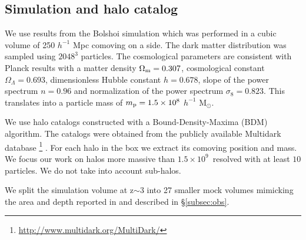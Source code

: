 \documentclass{emulateapj}
\newcommand{\hMsun}{{\ifmmode{h^{-1}{\rm {M_{\odot}}}}\else{$h^{-1}{\rm{M_{\odot}}}$}\fi}}
\begin{document}
\subsection{Simulation and halo catalog}
\label{subsec:sim}

We use results from the Bolshoi simulation \citep{Bolshoi,BolshoiP} which was
performed in a cubic volume of 250 $h^{-1}$ Mpc comoving on a side. 
The dark matter distribution was sampled using  $2048^{3}$
particles. 
The cosmological parameters are consistent with Planck
results \citep{Planck2014} with a matter density 
$\Omega_{\rm m} = 0.307$, cosmological constant
$\Omega_{\Lambda}=0.693$, dimensionless Hubble constant $h=0.678$, slope
of the power spectrum  $n=0.96$ and normalization of the power
spectrum $\sigma_{8}=0.823$.  
This translates into a particle mass of  $m_{\rm p}=1.5\times 10^{8}$
$h^{-1}$ M$_{\odot}$.   


We use halo catalogs constructed with a Bound-Density-Maxima (BDM)
algorithm. 
The catalogs were obtained from the publicly available Multidark
database  \footnote{\url{http://www.multidark.org/MultiDark/}}
\citep{MultiDark}. 
For each  halo in the box we extract its comoving position and mass.  
We focus our work on halos more massive than $1.5\times
10^{9}$\hMsun\ resolved with at least  $10$ particles. 
We do not take into account sub-halos.


We split the simulation volume at z$\sim$3 into  27 smaller mock
volumes mimicking the  area and depth reported in \citet{Bielby16} and
described in \S \ref{subsec:obs}.   
\end{document}
